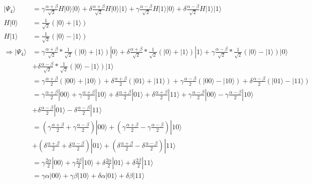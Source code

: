 \documentclass{article}
\begin{document}
\begin{equation}
\begin{split}
    |\Psi_4\rangle & = \gamma\frac{\alpha + \beta}{\sqrt{2}}H|0\rangle|0\rangle
        + \delta\frac{\alpha + \beta}{\sqrt{2}}H|0\rangle|1\rangle
        + \gamma\frac{\alpha - \beta}{\sqrt{2}}H|1\rangle|0\rangle
        + \delta\frac{\alpha - \beta}{\sqrt{2}}H|1\rangle|1\rangle \\
        H|0\rangle & = \frac{1}{\sqrt{2}}(|0\rangle + |1\rangle) \\
        H|1\rangle & = \frac{1}{\sqrt{2}}(|0\rangle - |1\rangle) \\
    \Longrightarrow |\Psi_4\rangle & = \gamma\frac{\alpha + \beta}{\sqrt{2}}*\frac{1}{\sqrt{2}}(|0\rangle + |1\rangle)|0\rangle
        + \delta\frac{\alpha + \beta}{\sqrt{2}}*\frac{1}{\sqrt{2}}(|0\rangle + |1\rangle)|1\rangle
        + \gamma\frac{\alpha - \beta}{\sqrt{2}}*\frac{1}{\sqrt{2}}(|0\rangle - |1\rangle)|0\rangle \\
        & + \delta\frac{\alpha - \beta}{\sqrt{2}}*\frac{1}{\sqrt{2}}(|0\rangle - |1\rangle)|1\rangle \\
    & = \gamma\frac{\alpha + \beta}{2}(|00\rangle + |10\rangle)
        + \delta\frac{\alpha + \beta}{2}(|01\rangle + |11\rangle)
        + \gamma\frac{\alpha - \beta}{2}(|00\rangle - |10\rangle)
        + \delta\frac{\alpha - \beta}{2}(|01\rangle - |11\rangle) \\
    & = \gamma\frac{\alpha + \beta}{2}|00\rangle + \gamma\frac{\alpha + \beta}{2}|10\rangle
        + \delta\frac{\alpha + \beta}{2}|01\rangle + \delta\frac{\alpha + \beta}{2}|11\rangle
        + \gamma\frac{\alpha - \beta}{2}|00\rangle - \gamma\frac{\alpha - \beta}{2}|10\rangle \\
        & + \delta\frac{\alpha - \beta}{2}|01\rangle - \delta\frac{\alpha - \beta}{2}|11\rangle \\
    & = (\gamma\frac{\alpha + \beta}{2} + \gamma\frac{\alpha - \beta}{2})|00\rangle
        + (\gamma\frac{\alpha + \beta}{2} - \gamma\frac{\alpha - \beta}{2})|10\rangle \\
        & + (\delta\frac{\alpha + \beta}{2} + \delta\frac{\alpha - \beta}{2})|01\rangle
        + (\delta\frac{\alpha + \beta}{2} - \delta\frac{\alpha - \beta}{2})|11\rangle \\
    & = \gamma\frac{2\alpha}{2}|00\rangle + \gamma\frac{2\beta}{2}|10\rangle
        + \delta\frac{2\alpha}{2}|01\rangle + \delta\frac{2\beta}{2}|11\rangle \\
    & = \gamma\alpha|00\rangle + \gamma\beta|10\rangle + \delta\alpha|01\rangle + \delta\beta|11\rangle \\

\end{split}
\end{equation}
\end{document}
